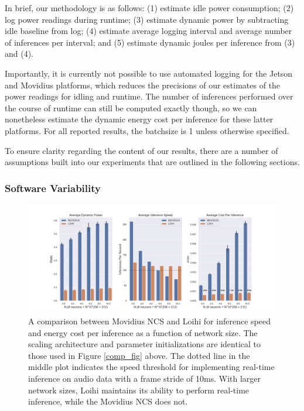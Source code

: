 \documentclass{article}
\begin{document}
In brief, our methodology is as follows: (1) estimate idle power consumption; (2) log power readings during runtime; (3) estimate dynamic power by subtracting idle baseline from log; (4) estimate average logging interval and average number of inferences per interval; and (5) estimate dynamic joules per inference from (3) and (4).

Importantly, it is currently not possible to use automated logging for the Jetson and Movidius platforms, which reduces the precisions of our estimates of the power readings for idling and runtime. The number of inferences performed over the course of runtime can still be computed exactly though, so we can nonetheless estimate the dynamic energy cost per inference for these latter platforms. For all reported results, the batchsize is 1 unless otherwise specified.

To ensure clarity regarding the content of our results, there are a number of assumptions built into our experiments that are outlined in the following sections.

\subsubsection{Software Variability}

\begin{figure}[ht!]
\centering
    \includegraphics[width=6.7in]{./figures/movidius_summary.png}
	\caption{A comparison between Movidius NCS and Loihi for inference speed and energy cost per inference as a function of network size. The scaling architecture and parameter initializations are identical to those used in Figure \ref{comp_fig} above. The dotted line in the middle plot indicates the speed threshold for implementing real-time inference on audio data with a frame stride of 10ms. With larger network sizes, Loihi maintains its ability to perform real-time inference, while the Movidius NCS does not.}
\label{scaling_fig}
\end{figure}
\end{document}
